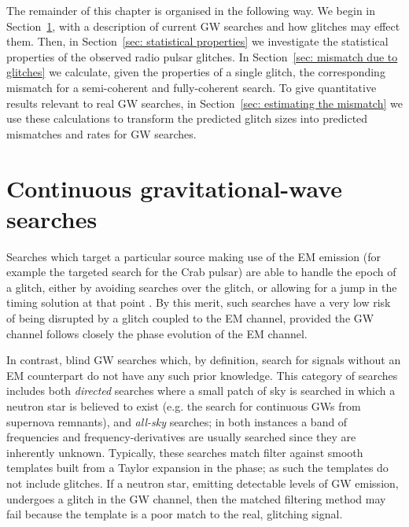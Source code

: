 \documentclass[../full_thesis/full_thesis.tex]{subfiles}
\begin{document}

The remainder of this chapter is organised in the following way. We begin in
Section~\ref{sec: continuous gravitational-wave searches}, with a description
of current GW searches and how glitches may effect them. Then, in
Section~\ref{sec: statistical properties} we investigate the statistical
properties of the observed radio pulsar glitches. In Section~\ref{sec: mismatch
due to glitches} we calculate, given the properties of a single glitch, the
corresponding mismatch for a semi-coherent and fully-coherent search.  To give
quantitative results relevant to real GW searches, in Section~\ref{sec:
estimating the mismatch} we use these calculations to transform the predicted
glitch sizes into predicted mismatches and rates for GW searches.

\section{Continuous gravitational-wave searches}
\label{sec: continuous gravitational-wave searches}

Searches which target a particular source making use of the EM emission (for
example the \citet{abbott2010searches} targeted search for the Crab pulsar) are able to
handle the epoch of a glitch, either by avoiding searches over the glitch, or
allowing for a jump in the timing solution at that point \citep{abbott2010searches}. By
this merit, such searches have a very low risk of being disrupted by a glitch
coupled to the EM channel, provided the GW channel follows closely the phase
evolution of the EM channel.

In contrast, blind GW searches which, by definition, search for signals without an
EM counterpart do not have any such prior knowledge. This category of searches
includes both \emph{directed} searches where a small patch of sky is searched
in which a neutron star is believed to exist (e.g. the \citet{aasi2015searches} search
for continuous GWs from supernova remnants), and \emph{all-sky} searches; in
both instances a band of frequencies and frequency-derivatives are usually
searched since they are inherently unknown. Typically, these searches
match filter against smooth templates built from a Taylor expansion in
the phase; as such the templates do not include glitches. If a neutron star, emitting
detectable levels of GW emission, undergoes a glitch in the GW channel, then the
matched filtering method may fail because the template is a poor match to the
real, glitching signal.
\end{document}
